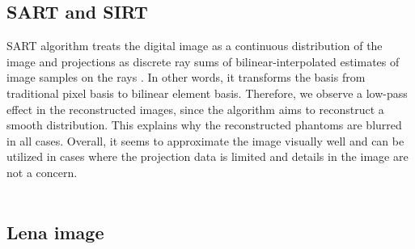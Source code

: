 \documentclass[journal]{IEEEtran}
\begin{document}
\subsection{SART and SIRT}
SART algorithm treats the digital image as a continuous distribution of the image and projections as discrete ray sums of bilinear-interpolated estimates of image samples on the rays \cite*{andersen1984sart}. In other words, it transforms the basis from traditional pixel basis to bilinear element basis. Therefore, we observe a low-pass effect in the reconstructed images, since the algorithm aims to reconstruct a smooth distribution. This explains why the reconstructed phantoms are blurred in all cases. Overall, it seems to approximate the image visually well and can be utilized in cases where the projection data is limited and details in the image are not a concern.
\\
\\
\subsection{Lena image}

\newpage
\printbibliography
\end{document}
